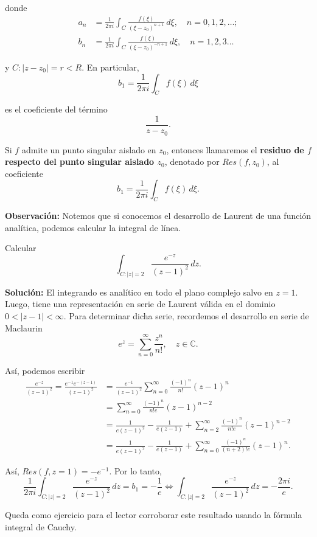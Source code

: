 donde
\begin{align*}
    a_n &= \frac{1}{2\pi i} \int_C \frac{f(\xi)}{(\xi-z_0)^{n+1}} \,d\xi, \quad n = 0,1,2, \dots; \\
    b_n &=  \frac{1}{2\pi i} \int_C \frac{f(\xi)}{(\xi-z_0)^{-n+1}} \,d\xi, \quad n =1,2, 3 \dots
\end{align*}

y $C: |z-z_0| = r < R$. En particular,
$$b_1 = \frac{1}{2\pi i} \int_{C} f(\xi) \,d\xi$$

es el coeficiente del término
$$\frac{1}{z-z_0}.$$

\begin{defi}
Si $f$ admite un punto singular aislado en $z_0$, entonces llamaremos el \textbf{residuo de $f$ respecto del punto singular aislado $z_0$}, denotado por $Res(f,z_0)$, al coeficiente
$$b_1 = \frac{1}{2\pi i} \int_{C} f(\xi) \,d\xi.$$
\end{defi}

\textbf{Observación:} Notemos que si conocemos el desarrollo de Laurent de una función analítica, podemos calcular la integral de línea.

\begin{ejemplo}
Calcular
$$\int_{C: |z| = 2} \frac{e^{-z}}{(z-1)^2} \,dz.$$

\textbf{Solución:} El integrando es analítico en todo el plano complejo salvo en $z = 1$. Luego, tiene una representación en serie de Laurent válida en el dominio $ 0< |z-1| < \infty$. Para determinar dicha serie, recordemos el desarrollo en serie de Maclaurin
$$e^z = \sum_{n=0}^{\infty} \frac{z^n}{n!}, \quad z \in \mathbb{C}.$$

Así, podemos escribir
\begin{align*}
    \frac{e^{-z}}{(z-1)^2} = \frac{e^{-1} e^{-(z-1)}}{(z-1)^2} &= \frac{e^{-1}}{(z-1)^2} \sum_{n=0}^{\infty} \frac{(-1)^n}{n!} (z-1)^n \\
    &=  \sum_{n=0}^{\infty} \frac{(-1)^n}{n!e} (z-1)^{n-2} \\
    &= \frac{1}{e(z-1)^2} - \frac{1}{e(z-1)} + \sum_{n=2}^{\infty} \frac{(-1)^n}{n!e} (z-1)^{n-2} \\
    &=  \frac{1}{e(z-1)^2} - \frac{1}{e(z-1)} + \sum_{n=0}^{\infty} \frac{(-1)^n}{(n+2)!e} (z-1)^{n}.
\end{align*}

Así, $Res(f,z = 1) = - e^{-1}$. Por lo tanto,
$$\frac{1}{2\pi i} \int_{C: |z| = 2} \frac{e^{-z}}{(z-1)^2} \,dz = b_1 = - \frac{1}{e} \Leftrightarrow  \int_{C: |z| = 2} \frac{e^{-z}}{(z-1)^2} \,dz = - \frac{2\pi i}{e}.$$

Queda como ejercicio para el lector corroborar este resultado usando la fórmula integral de Cauchy. 
\end{ejemplo}

